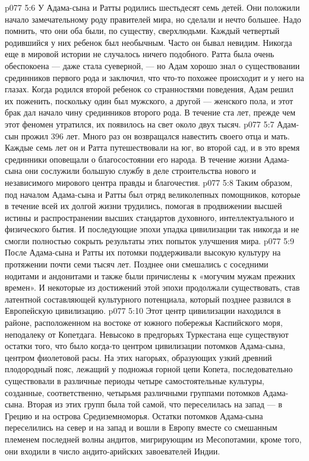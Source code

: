 \vs p077 5:6 \pc У Адама\hyp{}сына и Ратты родились шестьдесят семь детей. Они положили начало замечательному роду правителей мира, но сделали и нечто большее. Надо помнить, что они оба были, по существу, сверхлюдьми. Каждый четвертый родившийся у них ребенок был необычным. Часто он бывал невидим. Никогда еще в мировой истории не случалось ничего подобного. Ратта была очень обеспокоена --- даже стала суеверной, --- но Адам хорошо знал о существовании срединников первого рода и заключил, что что\hyp{}то похожее происходит и у него на глазах. Когда родился второй ребенок со странностями поведения, Адам решил их поженить, поскольку один был мужского, а другой --- женского пола, и этот брак дал начало чину срединников второго рода. В течение ста лет, прежде чем этот феномен утратился, их появилось на свет около двух тысяч.
\vs p077 5:7 \pc Адам\hyp{}сын прожил 396 лет. Много раз он возвращался навестить своего отца и мать. Каждые семь лет он и Ратта путешествовали на юг, во второй сад, и в это время срединники оповещали о благосостоянии его народа. В течение жизни Адама\hyp{}сына они сослужили большую службу в деле строительства нового и независимого мирового центра правды и благочестия.
\vs p077 5:8 Таким образом, под началом Адама\hyp{}сына и Ратты был отряд великолепных помощников, которые в течение всей их долгой жизни трудились, помогая в продвижении высшей истины и распространении высших стандартов духовного, интеллектуального и физического бытия. И последующие эпохи упадка цивилизации так никогда и не смогли полностью сокрыть результаты этих попыток улучшения мира.
\vs p077 5:9 \pc После Адама\hyp{}сына и Ратты их потомки поддерживали высокую культуру на протяжении почти семи тысяч лет. Позднее они смешались с соседними нодитами и андонитами и также были причислены к «могучим мужам прежних времен». И некоторые из достижений этой эпохи продолжали существовать, став латентной составляющей культурного потенциала, который позднее развился в Европейскую цивилизацию.
\vs p077 5:10 Этот центр цивилизации находился в районе, расположенном на востоке от южного побережья Каспийского моря, неподалеку от Копетдага. Невысоко в предгорьях Туркестана еще существуют остатки того, что было когда\hyp{}то центром цивилизации потомков Адама\hyp{}сына, центром фиолетовой расы. На этих нагорьях, образующих узкий древний плодородный пояс, лежащий у подножья горной цепи Копета, последовательно существовали в различные периоды четыре самостоятельные культуры, созданные, соответственно, четырьмя различными группами потомков Адама\hyp{}сына. Вторая из этих групп была той самой, что переселилась на запад --- в Грецию и на острова Средиземноморья. Остатки потомков Адама\hyp{}сына переселились на север и на запад и вошли в Европу вместе со смешанным племенем последней волны андитов, мигрирующим из Месопотамии, кроме того, они входили в число андито\hyp{}арийских завоевателей Индии.
